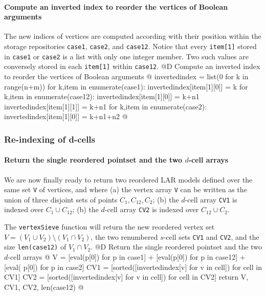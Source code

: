 \documentclass[11pt,oneside]{article}	%
\begin{document}
\paragraph{Compute an inverted index to reorder the vertices of Boolean arguments}
The new indices of vertices are computed according with their position within the storage repositories \texttt{case1}, \texttt{case2}, and \texttt{case12}. Notice that every \texttt{item[1]} stored in \texttt{case1} or \texttt{case2} is a list with only one integer member. Two such values are conversely stored in each \texttt{item[1]} within \texttt{case12}.
@D Compute an inverted index to reorder the vertices of Boolean arguments 
@{
	invertedindex = list(0 for k in range(n+m))
	for k,item in enumerate(case1):
		invertedindex[item[1][0]] = k
	for k,item in enumerate(case12):
		invertedindex[item[1][0]] = k+n1
		invertedindex[item[1][1]] = k+n1
	for k,item in enumerate(case2):
		invertedindex[item[1][0]] = k+n1+n2
@}

\subsubsection{Re-indexing of d-cells}

\paragraph{Return the single reordered pointset and the two $d$-cell arrays}
We are now finally ready to return two reordered LAR models defined over the same set \texttt{V} of vertices, and where (a) the vertex array \texttt{V} can be written as the union of three disjoint sets of points $C_1,C_{12},C_2$; (b) the $d$-cell array \texttt{CV1} is indexed over $C_1\cup C_{12}$; (b) the $d$-cell array \texttt{CV2} is indexed over $C_{12}\cup C_{2}$. 

The \texttt{vertexSieve} function will return the new reordered vertex set $V = (V_1 \cup V_2) \setminus (V_1 \cap V_2)$, the two renumbered $s$-cell sets \texttt{CV1} and \texttt{CV2}, and the size \texttt{len(case12)} of $V_1 \cap V_2$.
@D Return the single reordered pointset and the two $d$-cell arrays
@{
	V = [eval(p[0]) for p in case1] + [eval(p[0]) for p in case12] + [eval(
				p[0]) for p in case2]
	CV1 = [sorted([invertedindex[v] for v in cell]) for cell in CV1]
	CV2 = [sorted([invertedindex[v] for v in cell]) for cell in CV2]
	return V, CV1, CV2, len(case12)
@}
\end{document}
